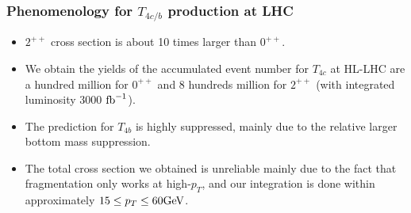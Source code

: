 \begin{frame}
  \frametitle{Phenomenology for $T_{4c/b}$ production at LHC}

  \begin{itemize}
    \item $2^{++}$ cross section is about 10 times larger than $0^{++}$.
    \item We obtain the yields of the accumulated event number for $T_{4c}$ at HL-LHC are a hundred million for $0^{++}$ and 8 hundreds million for $2^{++}$ (with integrated luminosity 3000 $\rm{fb}^{-1}$).
    \item The
          prediction for $T_{4b}$ is highly suppressed, mainly due to the relative larger bottom mass suppression.
    \item The total cross section we obtained is unreliable mainly due to the fact that fragmentation only works at high-$p_T$, and our integration is done within approximately $15\leq p_T\leq 60 \rm{GeV}$.
  \end{itemize}

\end{frame}

